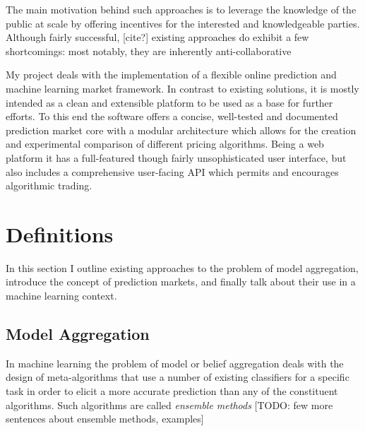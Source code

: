 \documentclass[bsc,frontabs,twoside,singlespacing,parskip,deptreport]{infthesis}     %
\begin{document}
The main motivation behind such approaches is to leverage the knowledge of the public at scale by offering incentives for the interested and knowledgeable parties. Although fairly successful, [cite?] existing approaches do exhibit a few shortcomings: most notably, they are inherently anti-collaborative                                                                                                                                                                                                                                                                                                                                                                                                                                                                                                                                                                                                

    My project deals with the implementation of a flexible online prediction and machine learning market framework. In contrast to existing solutions, it is mostly intended as a clean and extensible platform to be used as a base for further efforts. To this end the software offers a concise, well-tested and documented prediction market core with a modular architecture which allows for the creation and experimental comparison of different pricing algorithms. Being a web platform it has a full-featured though fairly unsophisticated user interface, but also includes a comprehensive user-facing API which permits and encourages algorithmic trading.
   
   
   
\chapter{Definitions}

    In this section I outline existing approaches to the problem of model aggregation, introduce the concept of prediction markets, and finally talk about their use in a machine learning context. 


\section{Model Aggregation}
    In machine learning the problem of model or belief aggregation deals with the design of meta-algorithms that use a number of existing classifiers for a specific task in order to elicit a more accurate prediction than any of the constituent algorithms. Such algorithms are called {\em ensemble methods} [TODO: few more sentences about ensemble methods, examples]
\end{document}
